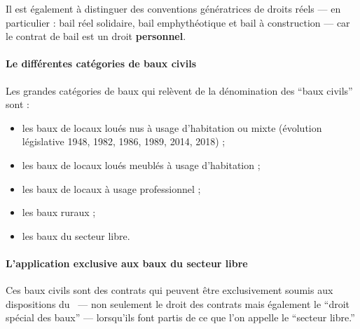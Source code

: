 \documentclass[10pt,a4paper,twoside]{article}
\makeatletter
\newcommand*{\cciv}{\@ifstar{\mbox{C.~civ.}}{Code civil}\xspace}
\makeatother
\begin{document}
	Il est également à distinguer des conventions génératrices de droits réels ---
		en particulier : bail réel solidaire, bail emphythéotique et bail à
			construction --- car le contrat de bail est un droit \textbf{personnel}.

	\paragraph{Le différentes catégories de baux civils} Les grandes catégories de
		baux qui relèvent de la dénomination des \enquote{baux civils} sont :
		\begin{itemize}
			\item les baux de locaux loués nus à usage d’habitation ou mixte
				(évolution législative 1948, 1982, 1986, 1989, 2014, 2018) ;
			\item les baux de locaux loués meublés à usage d’habitation ;
			\item les baux de locaux à usage professionnel ;
			\item les baux ruraux ;
			\item les baux du secteur libre.
		\end{itemize}

	\paragraph{L'application exclusive aux baux du secteur libre} Ces baux civils
		sont des contrats qui peuvent être exclusivement soumis aux dispositions du
		\cciv\ --- non seulement le droit des contrats mais également le
		\enquote{droit spécial des baux} --- lorsqu'ils font partis de ce que l'on
		appelle le \enquote{secteur libre.}
\end{document}
